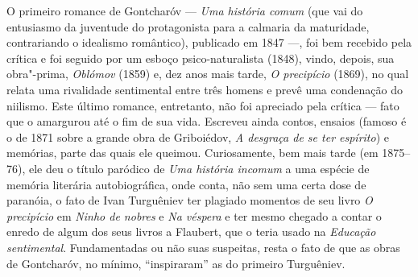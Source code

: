 O primeiro romance  de Gontcharóv --- \emph{Uma história comum} (que vai do entusiasmo da juventude do protagonista para a calmaria da maturidade, contrariando o idealismo romântico), publicado em 1847 ---, foi bem recebido pela crítica e foi seguido por um esboço psico-naturalista (1848), vindo, depois, sua obra"-prima, \emph{Oblómov} (1859) e, dez anos mais tarde, \emph{O precipício} (1869), no qual relata uma rivalidade sentimental entre três homens e prevê uma condenação do niilismo. Este último romance, entretanto, não foi apreciado pela crítica --- fato que o amargurou até o fim de sua vida. Escreveu ainda contos, ensaios (famoso é o de 1871 sobre a grande obra de Griboiédov, \emph{A desgraça de se ter espírito}) e memórias, parte das quais ele queimou. Curiosamente, bem mais tarde (em 1875--76), ele deu o título paródico de \emph{Uma história incomum} a uma espécie de memória literária autobiográfica, onde conta, não sem uma certa dose de paranóia, o fato de Ivan Turguêniev ter plagiado momentos de seu livro \emph{O precipício} em \emph{Ninho de nobres} e \emph{Na véspera} e ter mesmo chegado a contar o enredo de algum dos seus livros a Flaubert, que o teria usado na \emph{Educação sentimental}. Fundamentadas ou não suas suspeitas, resta o fato de que as obras de Gontcharóv, no mínimo, ``inspiraram'' as do primeiro Turguêniev.

